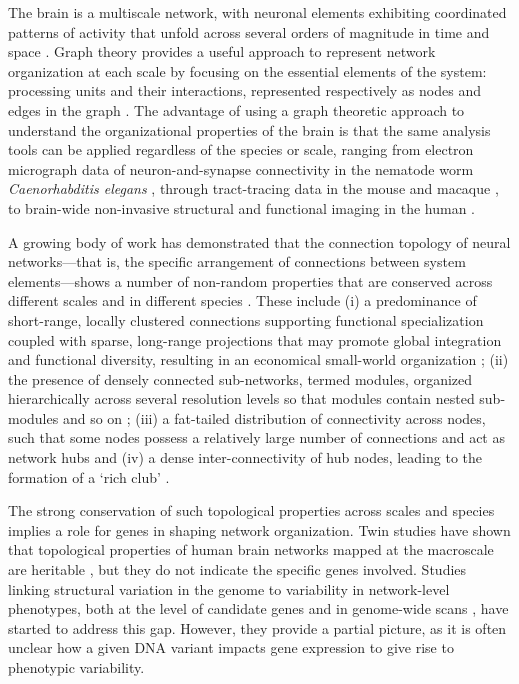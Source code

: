 The brain is a multiscale network, with neuronal elements exhibiting coordinated patterns of activity that unfold across several orders of magnitude in time and space \citep{Buzsaki2004,Lichtman2011,Fornito2016}.
Graph theory provides a useful approach to represent network organization at each scale by focusing on the essential elements of the system: processing units and their interactions, represented respectively as nodes and edges in the graph \citep{Bullmore2009,Fornito2016}.
The advantage of using a graph theoretic approach to understand the organizational properties of the brain is that the same analysis tools can be applied regardless of the species or scale, ranging from electron micrograph data of neuron-and-synapse connectivity in the nematode worm \textit{Caenorhabditis elegans} \citep{White1986,Varshney2011}, through tract-tracing data in the mouse \citep{Oh2014,Gamanut2018} and macaque \citep{Stephan2001,Markov2014}, to brain-wide non-invasive structural and functional imaging in the human \citep{Bassett2009a,Bullmore2009,Fornito2013}.

A growing body of work has demonstrated that the connection topology of neural networks---that is, the specific arrangement of connections between system elements---shows a number of non-random properties that are conserved across different scales and in different species \citep{Bullmore2009,Sporns2011,Fornito2016,VandenHeuvel2016,Schroter2017}. These include (i) a predominance of short-range, locally clustered connections supporting functional specialization coupled with sparse, long-range projections that may promote global integration and functional diversity, resulting in an economical small-world organization \citep{Watts1998,Bassett2017,Betzel2017}; (ii) the presence of densely connected sub-networks, termed modules, organized hierarchically across several resolution levels so that modules contain nested sub-modules and so on \citep{Meunier2009,Bassett2010}; (iii) a fat-tailed distribution of connectivity across nodes, such that some nodes possess a relatively large number of connections and act as network hubs  \citep{VandenHeuvel2011,Towlson2013,VandenHeuvel2016} and (iv) a dense inter-connectivity of hub nodes, leading to the formation of a `rich club' \citep{Zamora-Lopez2010,VandenHeuvel2011,Harriger2012,Towlson2013}.

The strong conservation of such topological properties across scales and species implies a role for genes in shaping network organization. Twin studies have shown that topological properties of human brain networks mapped at the macroscale are heritable \citep{Smit2008,Fornito2011,VandenHeuvel2013e,Bohlken2014,Sinclair2015,Zhan2015,Colclough2017}, but they do not indicate the specific genes involved. Studies linking structural variation in the genome to variability in network-level phenotypes, both at the level of candidate genes \citep{Liu2010,Brown2011,Dennis2011,Markett2017} and in genome-wide scans \citep{Jahanshad2013}, have started to address this gap. However, they provide a partial picture, as it is often unclear how a given DNA variant impacts gene expression to give rise to phenotypic variability. 

